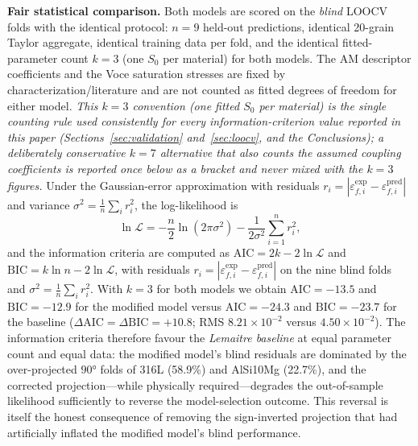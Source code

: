 \documentclass[12pt,a4paper,twocolumn]{article}
\begin{document}
\textbf{Fair statistical comparison.} Both models are scored on the \emph{blind} LOOCV folds with the identical protocol: $n = 9$ held-out predictions, identical 20-grain Taylor aggregate, identical training data per fold, and the identical fitted-parameter count $k = 3$ (one $S_0$ per material) for both models. The AM descriptor coefficients and the Voce saturation stresses are fixed by characterization/literature and are not counted as fitted degrees of freedom for either model. \emph{This $k=3$ convention (one fitted $S_0$ per material) is the single counting rule used consistently for every information-criterion value reported in this paper (Sections~\ref{sec:validation} and~\ref{sec:loocv}, and the Conclusions); a deliberately conservative $k=7$ alternative that also counts the assumed coupling coefficients is reported once below as a bracket and never mixed with the $k=3$ figures.} Under the Gaussian-error approximation with residuals $r_i = |\varepsilon_{f,i}^{\mathrm{exp}} - \varepsilon_{f,i}^{\mathrm{pred}}|$ and variance $\sigma^2 = \frac{1}{n}\sum_i r_i^2$, the log-likelihood is
\begin{equation}
\ln \mathcal{L} = -\frac{n}{2}\ln(2\pi\sigma^2) - \frac{1}{2\sigma^2}\sum_{i=1}^{n} r_i^2,
\label{eq:loglike}
\end{equation}
and the information criteria are computed as $\mathrm{AIC} = 2k - 2\ln\mathcal{L}$ and $\mathrm{BIC} = k\ln n - 2\ln\mathcal{L}$, with residuals $r_i = |\varepsilon_{f,i}^{\mathrm{exp}} - \varepsilon_{f,i}^{\mathrm{pred}}|$ on the nine blind folds and $\sigma^2 = \frac{1}{n}\sum_i r_i^2$. With $k = 3$ for both models we obtain $\mathrm{AIC} = -13.5$ and $\mathrm{BIC} = -12.9$ for the modified model versus $\mathrm{AIC} = -24.3$ and $\mathrm{BIC} = -23.7$ for the baseline ($\Delta\mathrm{AIC} = \Delta\mathrm{BIC} = +10.8$; RMS $8.21\times10^{-2}$ versus $4.50\times10^{-2}$). The information criteria therefore favour the \emph{Lemaitre baseline} at equal parameter count and equal data: the modified model's blind residuals are dominated by the over-projected $\ang{90}$ folds of 316L (58.9\%) and AlSi10Mg (22.7\%), and the corrected projection---while physically required---degrades the out-of-sample likelihood sufficiently to reverse the model-selection outcome. This reversal is itself the honest consequence of removing the sign-inverted projection that had artificially inflated the modified model's blind performance.
\end{document}
